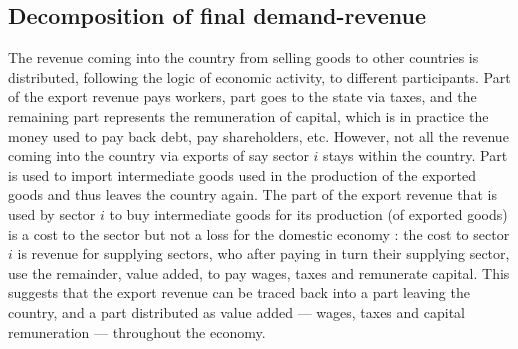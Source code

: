 \documentclass[12pt,english]{article}
\begin{document}


\subsection{Decomposition of final demand-revenue} \label{Section_decomposition}

The revenue coming into the country from selling goods to other countries is distributed, following the logic of economic activity, to different participants. Part of the export revenue pays workers, part goes to the state via taxes, and the remaining part represents the remuneration of capital, which is in practice the money used to pay back debt, pay shareholders, etc. However, not all the revenue coming into the country via exports of say sector $i$ stays within the country. Part is used to import intermediate goods used in the production of the exported goods and thus leaves the country again. The part of the export revenue that is used by sector $i$ to buy intermediate goods for its production (of exported goods) is a cost to the sector but not a loss for the domestic economy : the cost to sector $i$ is revenue for supplying sectors, who after paying in turn their supplying sector, use the remainder, value added, to pay wages, taxes and remunerate capital. This suggests that the export revenue can be traced back into a part leaving the country, and a part distributed as value added --- wages, taxes and capital remuneration --- throughout the economy. 
\end{document}
